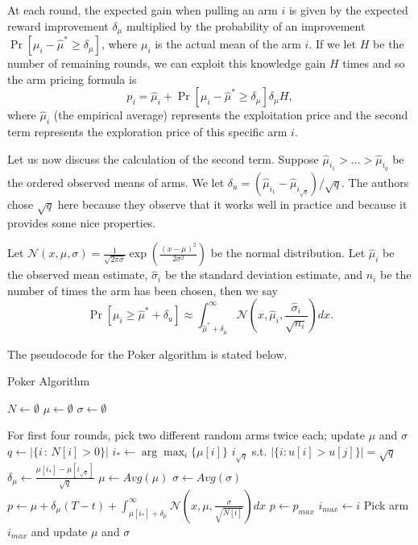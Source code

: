 \documentclass[12pt]{article}
\begin{document}
At each round, the expected gain when pulling an arm $i$ is given by the expected reward improvement $\delta_{\mu}$ multiplied by the probability of an
improvement $\Pr[\mu_i - \hat{\mu}^{*} \ge \delta_{\mu}]$, where $\mu_i$ is the actual mean of the arm $i$.  If we let $H$ be the number of remaining rounds, 
we can exploit this knowledge gain $H$ times and so the arm pricing formula is 
$$
p_i = \hat{\mu}_i + \Pr[\mu_i - \hat{\mu}^{*} \ge \delta_{\mu}] \delta_{\mu} H,
$$
where $\hat{\mu}_i$ (the empirical average) represents the exploitation price and the second term represents the exploration price of this specific arm $i$. 

Let us now discuss the calculation of the second term.  Suppose $\hat{\mu}_{i_1} > \ldots > \hat{\mu}_{i_q}$ be the ordered observed means of arms.  
We let $\delta_u = \left(\hat{\mu}_{i_1} - \hat{\mu}_{i_{\sqrt{q}}} \right)/\sqrt{q}$.  The authors chose $\sqrt{q}$ here because they observe that it works well
in practice and because it provides some nice properties.

Let $\mathcal{N}(x, \mu, \sigma) = \frac{1}{\sqrt{2 \pi \sigma}} \exp \left(\frac{(x - \mu)^2}{2 \sigma^2} \right)$ be the normal distribution.  
Let $\hat{\mu}_i$ be the observed mean estimate, $\hat{\sigma}_i$ be the standard deviation estimate, and $n_i$ be the number of times the arm has been chosen, then
we say
$$
\Pr[\mu_i \ge \hat{\mu}^{*} + \delta_u] \approx \int_{\hat{\mu}^{*} + \delta_{\mu}}^{\infty} \mathcal{N}\left(x, \hat{\mu}_{i}, \frac{\hat{\sigma}_i}{\sqrt{n_i}} \right) dx.
$$

The pseudocode for the Poker algorithm is stated below.

\begin{algorithm}[H]
  \caption{Poker Algorithm}
  $N \gets \emptyset$
  $\mu \gets \emptyset$ 
  $\sigma \gets \emptyset$

  \begin{algorithmic}
  \State For first four rounds, pick two different random arms twice each; update $\mu$ and $\sigma$
        \State $q \gets |\{i \, : \, N[i] > 0\}|$
        \State $i_{*} \gets \arg \max_{i} \{\mu[i]\}$
        \State $i_{\sqrt{q}}$ s.t. $|\{i : u[i] > u[j]\}| = \sqrt{q}$
        \State $\delta_{\mu} \gets \frac{\mu[i_{*}] - \mu[i_{\sqrt{q}}]}{\sqrt{q}}$ 
                \State $\mu \gets Avg(\mu)$ 
            \EndIf
                \State $\sigma \gets Avg(\sigma)$ 
            \EndIf
        \State $p \gets \mu + \delta_{\mu}(T - t) + \int_{\mu[i_*] + \delta_{\mu}}^{\infty} \mathcal{N}\left(x, \mu, \frac{\sigma}{\sqrt{N[i]}} \right) dx$
            \State$p \gets p_{max}$
            \State $i_{max} \gets i$ 
        \EndIf
        \EndFor
        \State Pick arm $i_{max}$ and update $\mu$ and $\sigma$
    \EndFor
  \end{algorithmic}
\end{algorithm}
\end{document}
